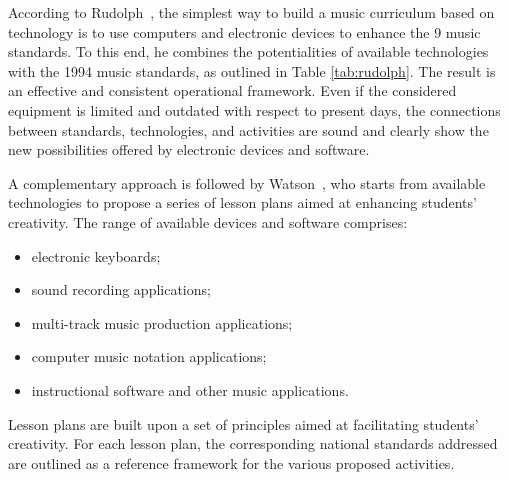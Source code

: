 \documentclass[journal]{IEEEtran}
\begin{document}
According to Rudolph~\cite{rudolph2004teaching}, the simplest way to build a music curriculum based on technology is to use computers and electronic devices to enhance the 9 music standards. To this end, he combines the potentialities of available technologies with the 1994 music standards, as outlined in Table \ref{tab:rudolph}. The result is an effective and consistent operational framework. Even if the considered equipment is limited and outdated with respect to present days, the connections between standards, technologies, and activities are sound and clearly show the new possibilities offered by electronic devices and software. 

A complementary approach is followed by Watson~\cite{watson2011using}, who starts from available technologies to propose a series of lesson plans aimed at enhancing students' creativity. The range of available devices and software comprises:
\begin{itemize}
	\item electronic keyboards;
	\item sound recording applications;
	\item multi-track music production applications;
	\item computer music notation applications;
	\item instructional software and other music applications.
\end{itemize}

Lesson plans are built upon a set of principles aimed at facilitating students' creativity.
For each lesson plan, the corresponding national standards addressed are outlined as a reference framework for the various proposed activities.
\end{document}
